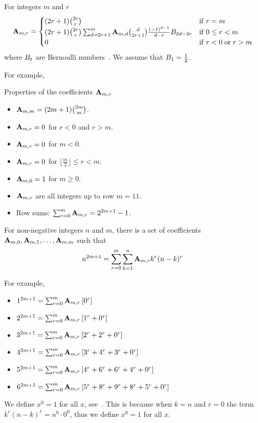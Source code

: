\begin{proposition}
    For integers $m$ and $r$
    \label{prop:coefficients_a}
    \begin{align*}
        {\mathbf{A}} \sb{m,r} =
        \begin{cases}
        (2r+1)
            \binom{2r}{r} & \mathrm{if} \; r=m \\
            (2r+1) \binom{2r}{r} \sum_{d = 2r+1}^{m} {\mathbf{A}} \sb{m,d} \binom{d}{2r+1} \frac{(-1)^{d-1}}{d-r}
            {B}\sb{2d-2r} & \mathrm{if} \; 0 \leq r<m \\
            0 & \mathrm{if} \; r<0 \; \mathrm{or} \; r>m
        \end{cases}
    \end{align*}
    where ${B}\sb{t}$ are Bernoulli numbers~\cite{weisstein2002bernoulli}.
    We assume that ${B}\sb{1}=\frac{1}{2}$.
\end{proposition}
For example,

Properties of the coefficients ${\mathbf{A}} \sb{m,r}$
\begin{itemize}
    \item ${\mathbf{A}} \sb{m,m} = (2m+1)\binom{2m}{m}$.
    \item ${\mathbf{A}} \sb{m,r} = 0$ for $r < 0$ and $r > m$.
    \item ${\mathbf{A}} \sb{m,r} = 0$ for $m < 0$.
    \item ${\mathbf{A}} \sb{m,r} = 0$ for $\lfloor \frac{m}{2} \rfloor \leq r < m$.
    \item ${\mathbf{A}} \sb{m,0} = 1$ for $m \geq 0$.
    \item ${\mathbf{A}} \sb{m,r}$ are all integers up to row $m = 11$.
    \item Row sums: $\sum_{r=0}^{m} {\mathbf{A}} \sb{m,r} = 2^{2m+1} - 1$.
\end{itemize}
\begin{proposition}
    \label{prop:odd-power-identity}
    For non-negative integers $n$ and $m$,
    there is a set of coefficients ${\mathbf{A}} \sb{m,0}, {\mathbf{A}} \sb{m,1}, \ldots, {\mathbf{A}} \sb{m,m}$ such that
    \begin{align*}
        n^{2m+1} = \sum_{r=0}^{m} \sum_{k=1}^{n} {\mathbf{A}} \sb{m,r} k^r (n-k)^r
    \end{align*}
\end{proposition}
For example,
\begin{itemize}
    \item $1^{2m+1} = \sum_{r=0}^{m} {\mathbf{A}} \sb{m,r} \left[ 0^r  \right]$
    \item $2^{2m+1} = \sum_{r=0}^{m} {\mathbf{A}} \sb{m,r} \left[ 1^r + 0^r  \right]$
    \item $3^{2m+1} = \sum_{r=0}^{m} {\mathbf{A}} \sb{m,r} \left[ 2^r + 2^r + 0^r  \right]$
    \item $4^{2m+1} = \sum_{r=0}^{m} {\mathbf{A}} \sb{m,r} \left[ 3^r + 4^r + 3^r + 0^r  \right]$
    \item $5^{2m+1} = \sum_{r=0}^{m} {\mathbf{A}} \sb{m,r} \left[ 4^r + 6^r + 6^r + 4^r + 0^r  \right]$
    \item $6^{2m+1} = \sum_{r=0}^{m} {\mathbf{A}} \sb{m,r} \left[ 5^r + 8^r + 9^r + 8^r + 5^r + 0^r  \right]$
\end{itemize}
We define $x^0 = 1$ for all $x$, see~\cite[~p. 162]{graham1994concrete}.
This is because when $k=n$ and $r=0$ the term $k^r (n-k)^r = n^0 \cdot 0^0$, thus we define $x^0 = 1$
for all $x$.
